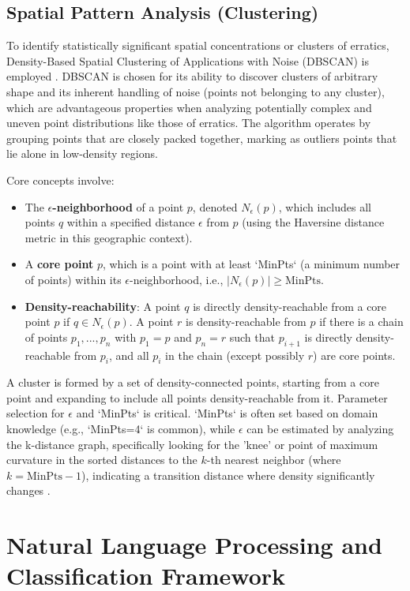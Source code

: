 \subsection{Spatial Pattern Analysis (Clustering)}
\label{subsec:clustering}

To identify statistically significant spatial concentrations or clusters of erratics, Density-Based Spatial Clustering of Applications with Noise (DBSCAN) is employed \cite{Ester1996}. DBSCAN is chosen for its ability to discover clusters of arbitrary shape and its inherent handling of noise (points not belonging to any cluster), which are advantageous properties when analyzing potentially complex and uneven point distributions like those of erratics. The algorithm operates by grouping points that are closely packed together, marking as outliers points that lie alone in low-density regions.

Core concepts involve:
\begin{itemize}
    \item The \textbf{$\epsilon$-neighborhood} of a point $p$, denoted $N_\epsilon(p)$, which includes all points $q$ within a specified distance $\epsilon$ from $p$ (using the Haversine distance metric in this geographic context).
    \item A \textbf{core point} $p$, which is a point with at least `MinPts` (a minimum number of points) within its $\epsilon$-neighborhood, i.e., $|N_\epsilon(p)| \ge \text{MinPts}$.
    \item \textbf{Density-reachability}: A point $q$ is directly density-reachable from a core point $p$ if $q \in N_\epsilon(p)$. A point $r$ is density-reachable from $p$ if there is a chain of points $p_1, ..., p_n$ with $p_1 = p$ and $p_n = r$ such that $p_{i+1}$ is directly density-reachable from $p_i$, and all $p_i$ in the chain (except possibly $r$) are core points.
\end{itemize}
A cluster is formed by a set of density-connected points, starting from a core point and expanding to include all points density-reachable from it. Parameter selection for $\epsilon$ and `MinPts` is critical. `MinPts` is often set based on domain knowledge (e.g., `MinPts=4` is common), while $\epsilon$ can be estimated by analyzing the k-distance graph, specifically looking for the 'knee' or point of maximum curvature in the sorted distances to the $k$-th nearest neighbor (where $k = \text{MinPts}-1$), indicating a transition distance where density significantly changes \cite{Ester1996}.

\section{Natural Language Processing and Classification Framework}
\label{sec:nlp_framework}


